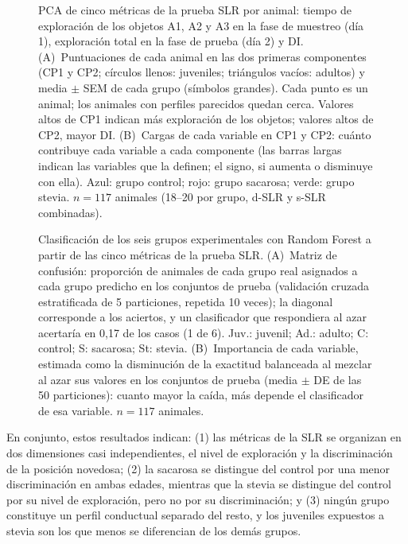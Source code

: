 \begin{figure}[htbp]
  \centering
  \caption[PCA de la prueba SLR]{PCA de cinco métricas de la prueba SLR por animal: tiempo de exploración de los objetos A1, A2 y A3 en la fase de muestreo (día 1), exploración total en la fase de prueba (día 2) y DI. (A)~Puntuaciones de cada animal en las dos primeras componentes (CP1 y CP2; círculos llenos: juveniles; triángulos vacíos: adultos) y media $\pm$ SEM de cada grupo (símbolos grandes). Cada punto es un animal; los animales con perfiles parecidos quedan cerca. Valores altos de CP1 indican más exploración de los objetos; valores altos de CP2, mayor DI. (B)~Cargas de cada variable en CP1 y CP2: cuánto contribuye cada variable a cada componente (las barras largas indican las variables que la definen; el signo, si aumenta o disminuye con ella). Azul: grupo control; rojo: grupo sacarosa; verde: grupo stevia. $n = 117$ animales (18--20 por grupo, d-SLR y s-SLR combinadas).}
  \label{fig:ml-pca}
\end{figure}

\begin{figure}[htbp]
  \centering
  \caption[Clasificación de los grupos experimentales con Random Forest]{Clasificación de los seis grupos experimentales con Random Forest a partir de las cinco métricas de la prueba SLR. (A)~Matriz de confusión: proporción de animales de cada grupo real asignados a cada grupo predicho en los conjuntos de prueba (validación cruzada estratificada de 5 particiones, repetida 10 veces); la diagonal corresponde a los aciertos, y un clasificador que respondiera al azar acertaría en 0,17 de los casos (1 de 6). Juv.: juvenil; Ad.: adulto; C: control; S: sacarosa; St: stevia. (B)~Importancia de cada variable, estimada como la disminución de la exactitud balanceada al mezclar al azar sus valores en los conjuntos de prueba (media $\pm$ DE de las 50 particiones): cuanto mayor la caída, más depende el clasificador de esa variable. $n = 117$ animales.}
  \label{fig:ml-rf}
\end{figure}

En conjunto, estos resultados indican: (1) las métricas de la SLR se organizan en dos dimensiones casi independientes, el nivel de exploración y la discriminación de la posición novedosa; (2) la sacarosa se distingue del control por una menor discriminación en ambas edades, mientras que la stevia se distingue del control por su nivel de exploración, pero no por su discriminación; y (3) ningún grupo constituye un perfil conductual separado del resto, y los juveniles expuestos a stevia son los que menos se diferencian de los demás grupos.
